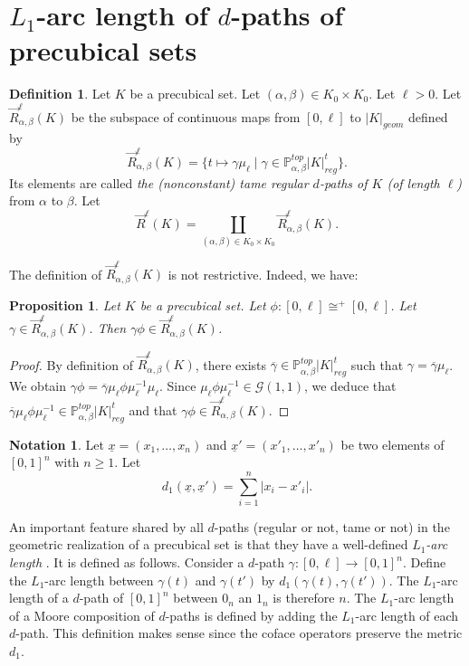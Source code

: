 \documentclass[a4paper,12pt]{amsart}
\newcommand{\p}{\times}
\renewcommand{\vec}{\overrightarrow}
\renewcommand{\P}{\mathbb{P}}
\newtheorem{prop}[thm]{Proposition}
\newcommand{\bp}{\begin{prop}}
\newcommand{\ep}{\end{prop}}
\newcommand{\bpf}{\begin{proof}}
\newcommand{\epf}{\end{proof}}
\theoremstyle{definition}
\newtheorem{defn}[thm]{Definition}
\newcommand{\bd}{\begin{defn}}
\newcommand{\ed}{\end{defn}}
\newtheorem{nota}[thm]{Notation}
\newcommand{\iso}{\cong}
\renewcommand{\geq}{\geqslant}
\newcommand{\mins}[1]{\texorpdfstring{$#1$}{Lg}}
\renewcommand{\P}{\mathbb{P}}
\begin{document}
\section{\mins{L_1}-arc length of \mins{d}-paths of precubical sets}
\label{length_sec}



\bd \label{path-with-length}
Let $K$ be a precubical set. Let $(\alpha,\beta)\in K_0\p K_0$. Let $\ell>0$. Let $\vec{R}^\ell_{\alpha,\beta}(K)$ be the subspace of continuous maps from $[0,\ell]$ to $|K|_{geom}$ defined by \[\vec{R}^\ell_{\alpha,\beta}(K) = \{t\mapsto \gamma\mu_\ell\mid \gamma\in \P^{top}_{\alpha,\beta}|K|^t_{reg}\}.\] 
Its elements are called \textit{the (nonconstant) tame regular $d$-paths of $K$ (of length $\ell$)} from $\alpha$ to $\beta$. Let 
\[
\vec{R}^\ell(K) = \coprod_{(\alpha,\beta)\in K_0\p K_0} \vec{R}^\ell_{\alpha,\beta}(K).
\]
\ed

The definition of $\vec{R}^\ell_{\alpha,\beta}(K)$ is not restrictive. Indeed, we have: 

\bp Let $K$ be a precubical set. Let $\phi:[0,\ell]\iso^+ [0,\ell]$. Let $\gamma\in \vec{R}^\ell_{\alpha,\beta}(K)$. Then $\gamma\phi\in \vec{R}^\ell_{\alpha,\beta}(K)$. \ep


\bpf By definition of $\vec{R}^\ell_{\alpha,\beta}(K)$, there exists $\overline{\gamma}\in \P^{top}_{\alpha,\beta}|K|^t_{reg}$ such that $\gamma = \overline{\gamma}\mu_{\ell}$. We obtain $\gamma\phi = \overline{\gamma}\mu_{\ell}\phi \mu^{-1}_{\ell}\mu_{\ell}$. Since $\mu_{\ell}\phi \mu^{-1}_{\ell}\in \mathcal{G}(1,1)$, we deduce that $\overline{\gamma}\mu_{\ell}\phi \mu^{-1}_{\ell}\in \P^{top}_{\alpha,\beta}|K|^t_{reg}$ and that $\gamma\phi\in \vec{R}^\ell_{\alpha,\beta}(K)$. 
\epf

\begin{nota}
	Let $\underline{x}=(x_1,\dots,x_n)$ and $\underline{x}'=(x'_1,\dots,x'_n)$ be two elements of $[0,1]^n$ with $n\geq 1$. Let
	\[
	d_1(\underline{x},\underline{x}') = \sum_{i=1}^{n} |x_i-x'_i|.
	\]
\end{nota}

An important feature shared by all $d$-paths (regular or not, tame or not) in the geometric realization of a precubical set is that they have a well-defined \textit{$L_1$-arc length} \cite[Section~2.2.1]{MR2521708} \cite[Section~2.2]{Raussen2012}. It is defined as follows. Consider a $d$-path $\gamma:[0,\ell]\to [0,1]^n$. Define the $L_1$-arc length between $\gamma(t)$ and $\gamma(t')$ by $d_1(\gamma(t),\gamma(t'))$. The $L_1$-arc length of a $d$-path of $[0,1]^n$ between $0_n$ an $1_n$ is therefore $n$. The $L_1$-arc length of a Moore composition of $d$-paths is defined by adding the $L_1$-arc length of each $d$-path. This definition makes sense since the coface operators preserve the metric $d_1$.
\end{document}
